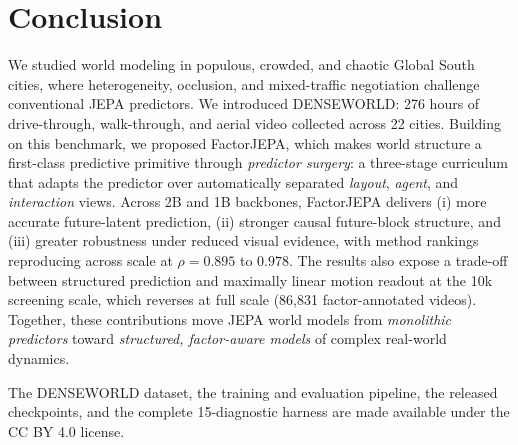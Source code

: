 \section{Conclusion}

We studied world modeling in populous, crowded, and chaotic Global
South cities, where heterogeneity, occlusion, and mixed-traffic negotiation
challenge conventional JEPA predictors. We introduced DENSEWORLD:
276 hours of drive-through, walk-through, and aerial video collected
across 22 cities. Building on this benchmark, we proposed
FactorJEPA, which makes world structure a
first-class predictive primitive through \emph{predictor surgery}: a
three-stage curriculum that adapts the predictor over automatically separated
\emph{layout}, \emph{agent}, and \emph{interaction}
views. Across 2B and 1B backbones, FactorJEPA delivers (i) more
accurate future-latent prediction, (ii) stronger causal
future-block structure, and (iii) greater robustness under
reduced visual evidence, with method rankings reproducing across scale at
$\rho=0.895$ to $0.978$. The results also expose a trade-off between structured
prediction and maximally linear motion readout at the 10k screening scale,
which reverses at full scale (86,831 factor-annotated videos). Together, these
contributions move JEPA world
models from \emph{monolithic predictors} toward
\emph{structured, factor-aware models} of complex real-world dynamics.

The DENSEWORLD dataset, the training and evaluation pipeline, the released
checkpoints, and the complete 15-diagnostic harness are made available under
the CC BY 4.0 license.
